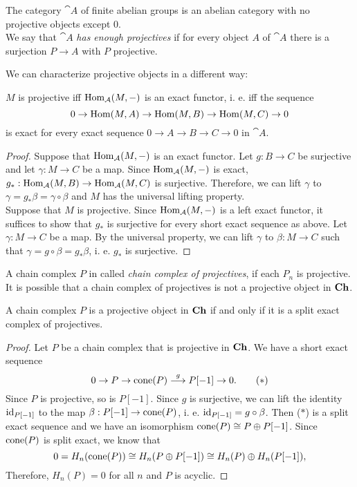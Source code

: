 \begin{remark}
	The category $\cat{A}$ of finite abelian groups is an abelian category with no projective objects except $0$. \\
	We say that $\cat{A}$ \textit{has enough projectives} if for every object $A$ of $\cat{A}$ there is a surjection $P\rightarrow A$ with $P$ projective.
\end{remark}

We can characterize projective objects in a different way:

\begin{lemma}
	$M$ is projective iff $\operatorname{Hom}_{\mathcal{A}}(M,-)$ is an exact functor, i. e. iff the sequence 
	$$0 \rightarrow \operatorname{Hom}(M,A) \rightarrow \operatorname{Hom}(M,B) \rightarrow \operatorname{Hom}(M,C) \rightarrow 0$$
	is exact for every exact sequence $0\rightarrow A \rightarrow B \rightarrow C \rightarrow 0$ in $\cat{A}$.
\end{lemma}

\begin{proof}
	Suppose that $\operatorname{Hom}_{\mathcal{A}}(M,-)$ is an exact functor.
	Let $g:B\rightarrow C$ be surjective and let $\gamma:M\rightarrow C$ be a map.
	Since $\operatorname{Hom}_{\mathcal{A}}(M,-)$ is exact, $g_*:\operatorname{Hom}_{\mathcal{A}}(M,B)\rightarrow\operatorname{Hom}_{\mathcal{A}}(M,C)$ is surjective.
	Therefore, we can lift $\gamma$ to $\gamma=g_*\beta=\gamma\circ\beta$ and $M$ has the universal lifting property. \\
	Suppose that $M$ is projective.
	Since $\operatorname{Hom}_{\mathcal{A}}(M,-)$ is a left exact functor, it suffices to show that $g_*$ is surjective for every short exact sequence as above.
	Let $\gamma:M\rightarrow C$ be a map.
	By the universal property, we can lift $\gamma$ to $\beta:M\rightarrow C$ such that $\gamma=g\circ\beta=g_*\beta$, i. e. $g_*$ is surjective.
\end{proof}

A chain complex $P$ in called \textit{chain complex of projectives}, if each $P_n$ is projective.
It is possible that a chain complex of projectives is not a projective object in $\textrm{\textup{\textbf{Ch}}}$.

\begin{exercise}
	A chain complex $P$ is a projective object in $\textrm{\textup{\textbf{Ch}}}$ if and only if it is a split exact complex of projectives.
\end{exercise}

\begin{proof}
	Let $P$ be a chain complex that is projective in $\textrm{\textup{\textbf{Ch}}}$.
	We have a short exact sequence \[0 \rightarrow P \rightarrow \operatorname{cone}(P) \overset{g}{\longrightarrow} P[-1] \rightarrow 0. \tag{$\ast$}\]
	Since $P$ is projective, so is $P[-1]$.
	Since $g$ is surjective, we can lift the identity $\operatorname{id}_{P[-1]}$ to the map $\beta:P[-1]\rightarrow\operatorname{cone}(P)$, i. e. $\operatorname{id}_{P[-1]}=g\circ\beta$.
	Then ($\ast$) is a split exact sequence and we have an isomorphism $\operatorname{cone}(P) \cong P \oplus P[-1]$.
	Since $\operatorname{cone}(P)$ is split exact, we know that
	\[0 = H_n(\operatorname{cone}(P)) \cong H_n(P \oplus P[-1]) \cong H_n(P) \oplus H_n(P[-1]),\]
	Therefore, $H_n(P)=0$ for all $n$ and $P$ is acyclic.
	
\end{proof}

